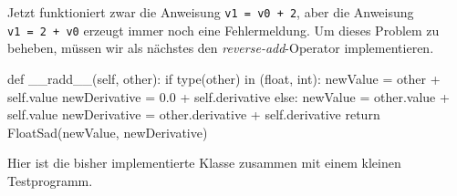 \documentclass[
  a4paper,
  DIV=11]{scrreprt}
\newenvironment{Shaded}{\begin{snugshade}}{\end{snugshade}}
\newcommand{\BuiltInTok}[1]{\textcolor[rgb]{0.00,0.23,0.31}{#1}}
\newcommand{\ControlFlowTok}[1]{\textcolor[rgb]{0.00,0.23,0.31}{#1}}
\newcommand{\FloatTok}[1]{\textcolor[rgb]{0.68,0.00,0.00}{#1}}
\newcommand{\FunctionTok}[1]{\textcolor[rgb]{0.28,0.35,0.67}{#1}}
\newcommand{\KeywordTok}[1]{\textcolor[rgb]{0.00,0.23,0.31}{#1}}
\newcommand{\NormalTok}[1]{\textcolor[rgb]{0.00,0.23,0.31}{#1}}
\newcommand{\OperatorTok}[1]{\textcolor[rgb]{0.37,0.37,0.37}{#1}}
\newcommand{\VariableTok}[1]{\textcolor[rgb]{0.07,0.07,0.07}{#1}}
\theoremstyle{definition}
\theoremstyle{definition}
\theoremstyle{remark}
\begin{document}
Jetzt funktioniert zwar die Anweisung \texttt{v1\ =\ v0\ +\ 2}, aber die
Anweisung \texttt{v1\ =\ 2\ +\ v0} erzeugt immer noch eine
Fehlermeldung. Um dieses Problem zu beheben, müssen wir als nächstes den
\emph{reverse-add}-Operator implementieren.

\begin{Shaded}
\begin{Highlighting}[]
\KeywordTok{def} \FunctionTok{\_\_radd\_\_}\NormalTok{(}\VariableTok{self}\NormalTok{, other):}
    \ControlFlowTok{if} \BuiltInTok{type}\NormalTok{(other) }\KeywordTok{in}\NormalTok{ (}\BuiltInTok{float}\NormalTok{, }\BuiltInTok{int}\NormalTok{):}
\NormalTok{        newValue }\OperatorTok{=}\NormalTok{ other }\OperatorTok{+} \VariableTok{self}\NormalTok{.value}
\NormalTok{        newDerivative }\OperatorTok{=} \FloatTok{0.0} \OperatorTok{+} \VariableTok{self}\NormalTok{.derivative}
    \ControlFlowTok{else}\NormalTok{:}
\NormalTok{        newValue }\OperatorTok{=}\NormalTok{ other.value }\OperatorTok{+} \VariableTok{self}\NormalTok{.value}
\NormalTok{        newDerivative }\OperatorTok{=}\NormalTok{ other.derivative }\OperatorTok{+} \VariableTok{self}\NormalTok{.derivative}
    \ControlFlowTok{return}\NormalTok{ FloatSad(newValue, newDerivative)}
\end{Highlighting}
\end{Shaded}

Hier ist die bisher implementierte Klasse zusammen mit einem kleinen
Testprogramm.
\end{document}
